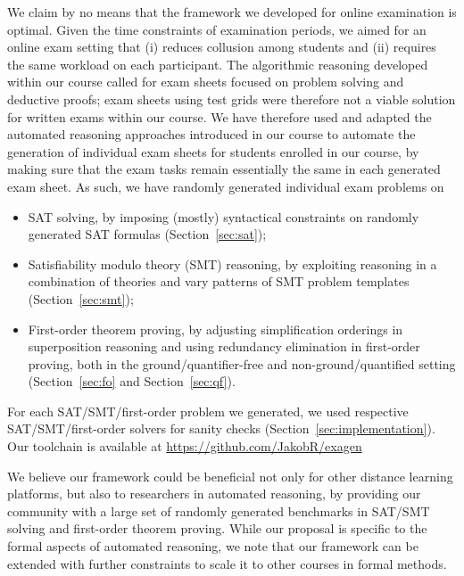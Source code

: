 We claim by no means that the framework we developed for online
examination is optimal.
Given the time constraints of examination periods, we aimed for an
online exam setting that (i) reduces collusion among students and  (ii)
requires the same workload on each participant.
The algorithmic reasoning developed within our
course called for exam sheets focused on problem solving and deductive
proofs;  exam sheets using test grids were therefore not a viable solution
for written exams within our course.
We have therefore used and adapted the automated reasoning approaches introduced in our
course to automate the generation of individual exam sheets for
students enrolled in our course, by making sure that the exam tasks
remain essentially the same in each generated exam sheet. As such, we have randomly generated
individual exam problems on 
\begin{itemize}
\item
    SAT solving, by imposing (mostly) syntactical constraints on
    randomly generated SAT formulas (Section~\ref{sec:sat});
\item Satisfiability modulo theory (SMT) reasoning, by exploiting reasoning in a combination of theories
  and vary patterns of SMT problem templates (Section~\ref{sec:smt}); 
\item First-order theorem proving, by adjusting simplification
  orderings in superposition reasoning and using redundancy elimination
  in first-order proving, both in the ground/quantifier-free 
  and non-ground/quantified setting (Section~\ref{sec:fo}
  and Section~\ref{sec:qf}). 
\end{itemize}
For each SAT/SMT/first-order problem we generated, we used respective
SAT/SMT/first-order solvers for sanity checks
(Section~\ref{sec:implementation}). Our toolchain is available at
\url{https://github.com/JakobR/exagen} 

We believe our framework could be beneficial not only for other
distance learning platforms, but also to researchers in automated
reasoning, by providing our community with a large set of randomly generated benchmarks in SAT/SMT solving and first-order theorem proving.
While our proposal is specific to the formal aspects of automated
reasoning, we note that  our framework can be extended with further
constraints to scale it to other courses in formal methods. 
